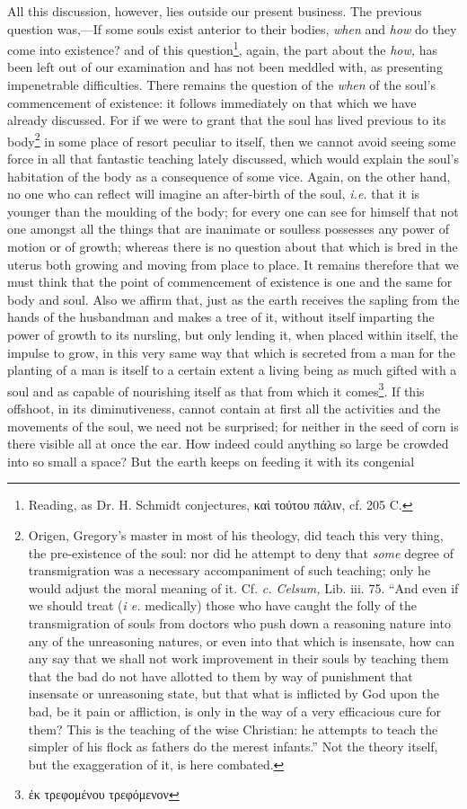 All this discussion, however, lies outside our present business. The previous question was,—If some souls exist anterior to their bodies, \emph{when} and \emph{how} do they come into existence? and of this question\footnote{Reading, as Dr. H. Schmidt conjectures, \textgreek{καὶ τούτου πάλιν}, cf. 205 C.}, again, the part about the \emph{how,} has been left out of our examination and has not been meddled with, as presenting impenetrable difficulties. There remains the question of the \emph{when} of the soul’s commencement of existence: it follows immediately on that which we have already discussed. For if we were to grant that the soul has lived previous to its body\footnote{Origen, Gregory’s master in most of his theology, did teach this very thing, the pre-existence of the soul: nor did he attempt to deny that \emph{some} degree of transmigration was a necessary accompaniment of such teaching; only he would adjust the moral meaning of it. Cf. \emph{c. Celsum,} Lib. iii. 75. “And even if we should treat (\emph{i e.} medically) those who have caught the folly of the transmigration of souls from doctors who push down a reasoning nature into any of the unreasoning natures, or even into that which is insensate, how can any say that we shall not work improvement in their souls by teaching them that the bad do not have allotted to them by way of punishment that insensate or unreasoning state, but that what is inflicted by God upon the bad, be it pain or affliction, is only in the way of a very efficacious cure for them? This is the teaching of the wise Christian: he attempts to teach the simpler of his flock as fathers do the merest infants.” Not the theory itself, but the exaggeration of it, is here combated.} in some place of resort peculiar to itself, then we cannot avoid seeing some force in all that fantastic teaching lately discussed, which would explain the soul’s habitation of the body as a consequence of some vice. Again, on the other hand, no one who can reflect will imagine an after-birth of the soul, \emph{i.e.} that it is younger than the moulding of the body; for every one can see for himself that not one amongst all the things that are inanimate or soulless possesses any power of motion or of growth; whereas there is no question about that which is bred in the uterus both growing and moving from place to place. It remains therefore that we must think that the point of commencement of existence is one and the same for body and soul. Also we affirm that, just as the earth receives the sapling from the hands of the husbandman and makes a tree of it, without itself imparting the power of growth to its nursling, but only lending it, when placed within itself, the impulse to grow, in this very same way that which is secreted from a man for the planting of a man is itself to a certain extent a living being as much gifted with a soul and as capable of nourishing itself as that from which it comes\footnote{\textgreek{ἐκ τρεφομένου τρεφόμενον}}. If this offshoot, in its diminutiveness, cannot contain at first all the activities and the movements of the soul, we need not be surprised; for neither in the seed of corn is there visible all at once the ear. How indeed could anything so large be crowded into so small a space? But the earth keeps on feeding it with its congenial 